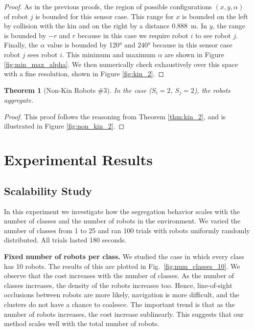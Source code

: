 \documentclass[letterpaper, 10 pt, conference]{ieeeconf}
\newtheorem{theorem}{Theorem}
\newcommand{\myparagraph}[1]{\textbf{#1.}}
\begin{document}
\begin{proof}
  As in the previous proofs, the region of possible configurations $(x, y, \alpha)$ of robot $j$ is bounded for this sensor case. This range for $x$ is bounded on the left by collision with the kin and on the right by a distance \SI{0.888}{\meter}. In $y$, the range is bounded by $-r$ and $r$ because in this case we require robot $i$ to see robot $j$. Finally, the $\alpha$ value is bounded by \ang{120} and \ang{240} because in this sensor case robot $j$ sees robot $i$. This minimum and maximum $\alpha$ are shown in Figure \ref{fig:min_max_alpha}. We then numerically check exhaustively over this space with a fine resolution, shown in Figure \ref{fig:kin_2}.

\end{proof}

\begin{theorem}[Non-Kin Robots \#3]\label{thm:non_kin_2}
  In the case ($S_i=2$, $S_j=2$), the robots aggregate.
\end{theorem}
\begin{proof}

  This proof follows the reasoning from Theorem \ref{thm:kin_2}, and is illustrated in Figure \ref{fig:non_kin_2}.

\end{proof}

\section{Experimental Results}

\subsection{Scalability Study} \label{section:scalability}

In this experiment we investigate how the segregation behavior scales with the
number of classes and the number of robots in the environment. We varied the
number of classes from 1 to 25 and ran 100 trials with robots uniformly randomly
distributed. All trials lasted 180 seconds.

\myparagraph{Fixed number of robots per class}
We studied the case in which every class has 10 robots. The results of this are
plotted in Fig.~\ref{fig:num_classes_10}. We observe that the cost increases
with the number of classes. As the number of classes increases,
the density of the robots increases too. Hence, line-of-sight occlusions between robots are more likely,
navigation is more difficult, and the clusters do not have a chance to coalesce.
The important trend is that as the number of robots increases, the cost increase sublinearly.
This suggests that our method scales well with the total number of robots.
\end{document}
